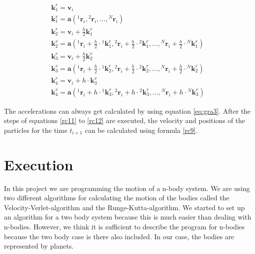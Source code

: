\documentclass[10pt,a4paper]{article}
\begin{document}
\begin{align}
\label{rc11}
\mathbf{k}_1^r = \mathbf{v}_i \\
\mathbf{k}_{1}^{v} = \mathbf{a}({}^{1}\mathbf{r}_i, {}^{2}\mathbf{r}_i,..., {}^{N}\mathbf{r}_i) \\
\mathbf{k}_2^r = \mathbf{v}_i + \frac{h}{2} \mathbf{k}_1^{v}	\\
\mathbf{k}_2^{v} = \mathbf{a}({}^{1}\mathbf{r}_i + \frac{h}{2}\cdot {}^{1}\mathbf{k}_1^r, {}^{2}\mathbf{r}_i + \frac{h}{2}\cdot {}^{2}\mathbf{k}_1^r,..., {}^{N}\mathbf{r}_i + \frac{h}{2}\cdot {}^{N}\mathbf{k}_1^r)	\\
\mathbf{k}_3^r = \mathbf{v}_i + \frac{h}{2} \mathbf{k}_2^v	\\
\mathbf{k}_3^{v} = \mathbf{a}({}^{1}\mathbf{r}_i + \frac{h}{2}\cdot {}^{1}\mathbf{k}_2^r, {}^{2}\mathbf{r}_i + \frac{h}{2}\cdot {}^{2}\mathbf{k}_2^r,..., {}^{N}\mathbf{r}_i + \frac{h}{2}\cdot {}^{N}\mathbf{k}_2^r)	\\
\mathbf{k}_4^r = \mathbf{v}_i + h \cdot \mathbf{k}_3^v	\\
\label{rc12}
\mathbf{k}_4^{v} = \mathbf{a}({}^{1}\mathbf{r}_i + h\cdot {}^{1}\mathbf{k}_3^r, {}^{2}\mathbf{r}_i + h\cdot {}^{2}\mathbf{k}_3^r,..., {}^{N}\mathbf{r}_i + h\cdot {}^{N}\mathbf{k}_3^r)
\end{align}

The accelerations can always get calculated by using equation \eqref{eq:gra3}. After the steps of equations \eqref{rc11} to \eqref{rc12} are executed, the velocity and positions of the particles for the time $t_{i+1}$ can be calculated using formula \eqref{rc9}.

\section{Execution}

In this project we are programming the motion of a n-body system. We are using two different algorithms for calculating the motion of the bodies called the Velocity-Verlet-algorithm and the Runge-Kutta-algorithm. 
We started to set up an algorithm for a two body system because this is much easier than dealing with n-bodies. However, we think it is sufficient to describe the program for n-bodies because the two body case is there also included. In our case, the bodies are represented by planets. 
\end{document}
